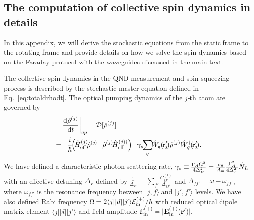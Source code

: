 \documentclass[aps,pra,twocolumn,superscriptaddress]{revtex4-1} %
\newcommand{\dt}[1]{\frac{{\mathrm d} {#1}}{{\mathrm d}t}}
\def\br{\mathbf{r}}
\def\bra#1{\langle{#1}\rvert}%
\def\ket#1{\lvert{#1}\rangle}%
\newcommand{\nn}{\nonumber}
\begin{document}


\begin{appendix}
\section{The computation of collective spin dynamics in details}\label{Sec::opticalpumpinginrotatingframe}
In this appendix, we will derive the stochastic equations from the static frame to the rotating frame and provide details on how we solve the spin dynamics based on the Faraday protocol with the waveguides discussed in the main text.

The collective spin dynamics in the QND measurement and spin squeezing process is described by the stochastic master equation defined in Eq.~\eqref{eq:totaldrhodt}. The optical pumping dynamics of the $ j $-th atom are governed by
\begin{align}\label{eq:op_master}
&\quad\left.\dt{\hat{\rho}^{(j)}}\right|_{op} = \mathcal{D}[\hat{\rho}^{(j)}]\nn\\
&=\!-\frac{i}{\hbar}\!\!\left(\!\hat{H}_{\rm eff}^{(j)}\!\hat{\rho}^{(j)} \!\!-\! \hat{\rho}^{(j)}\!\hat{H}_{\rm eff}^{(j)\dagger} \right) \!\!+\! \gamma_s\!\!\sum_{q}\!\!\hat{W}_q(\!\br'\!\!_j\!)\hat{\rho}^{(j)}\hat{W}_q^\dagger(\!\br'\!\!_j\!). %
\end{align}
We have defined a characteristic photon scattering rate, $\gamma_s \equiv \frac{\Gamma_A\Omega^2}{4\Delta_{F}^2}= \frac{\sigma_0}{A_{\rm in}}\frac{\Gamma_A^2}{4 \Delta_{F}^2} \dot{N}_L $ with an effective detuning $ \Delta_F $ defined by $ \frac{1}{\Delta_F}=\sum_{f'}\frac{C_{ff'}^{(1)}}{\Delta_{ff'}} $ and $ \Delta_{ff'}=\omega-\omega_{ff'} $, where $ \omega_{ff'} $ is the resonance frequency between $ \ket{j,f} $ and $ \ket{j',f'} $ levels.
We have also defined Rabi frequency $ \Omega=2\bra{j}|d|\ket{j'}\mathcal{E}^{(+)}_{\rm in}/\hbar $ with reduced optical dipole matrix element $\bra{j}|d|\ket{j'}$ and field amplitude $ \mathcal{E}^{(+)}_{\rm in}=|\mathbf{E}_{\rm in}^{(+)}(\br')| $.

\end{appendix}
\end{document}
